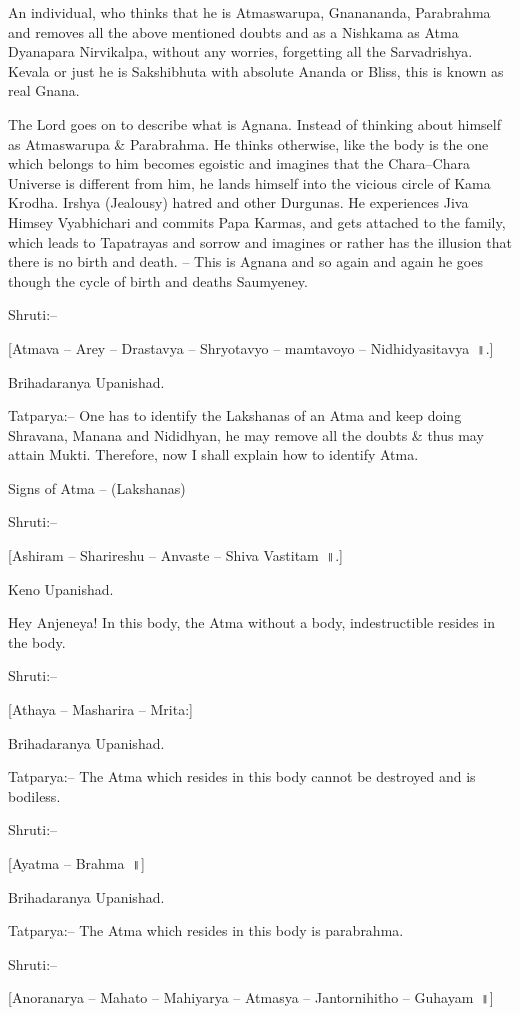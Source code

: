 An individual, who thinks that he is Atmaswarupa, Gnanananda, Parabrahma and removes all the above mentioned doubts and as a Nishkama as Atma Dyanapara Nirvikalpa, without any worries, forgetting all the Sarvadrishya. Kevala or just he is Sakshibhuta with absolute Ananda or Bliss, this is known as real Gnana.

The Lord goes on to describe what is Agnana. Instead of thinking about himself as Atmaswarupa \& Parabrahma. He thinks otherwise, like the body is the one which belongs to him becomes egoistic and imagines that the Chara–Chara Universe is different from him, he lands himself into the vicious circle of Kama Krodha. Irshya (Jealousy) hatred and other Durgunas. He experiences Jiva Himsey Vyabhichari and commits Papa Karmas, and gets attached to the family, which leads to Tapatrayas and sorrow and imagines or rather has the illusion that there is no birth and death. – This is Agnana and so again and again he goes though the cycle of birth and deaths Saumyeney.

Shruti:–

[Atmava – Arey – Drastavya – Shryotavyo – mamtavoyo – Nidhidyasitavya~॥.]

Brihadaranya Upanishad.

Tatparya:– One has to identify the Lakshanas of an Atma and keep doing Shravana, Manana and Nididhyan, he may remove all the doubts \& thus may attain Mukti. Therefore, now I shall explain how to identify Atma.

Signs of Atma – (Lakshanas)

Shruti:–

[Ashiram – Sharireshu – Anvaste – Shiva Vastitam~॥.]

Keno Upanishad.

Hey Anjeneya! In this body, the Atma without a body, indestructible resides in the body.

Shruti:–

[Athaya – Masharira – Mrita:]

Brihadaranya Upanishad.

Tatparya:– The Atma which resides in this body cannot be destroyed and is bodiless.

Shruti:–

[Ayatma – Brahma~॥]

Brihadaranya Upanishad.

Tatparya:– The Atma which resides in this body is parabrahma.

Shruti:–

[Anoranarya – Mahato – Mahiyarya – Atmasya – Jantornihitho – Guhayam~॥]

